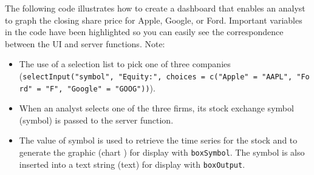 \documentclass[
]{article}
\begin{document}
The following code illustrates how to create a dashboard that enables an
analyst to graph the closing share price for Apple, Google, or Ford.
Important variables in the code have been highlighted so you can easily
see the correspondence between the UI and server functions. Note:

\begin{itemize}
\item
  The use of a selection list to pick one of three companies
  (\texttt{selectInput("symbol",\ "Equity:",\ choices\ =\ c("Apple"\ =\ "AAPL",\ "Ford"\ =\ "F",\ "Google"\ =\ "GOOG"))}).
\item
  When an analyst selects one of the three firms, its stock exchange
  symbol (symbol) is passed to the server function.
\item
  The value of symbol is used to retrieve the time series for the
  stock and to generate the graphic (chart ) for display with
  \texttt{boxSymbol}. The symbol is also inserted into a text string (text) for display with \texttt{boxOutput}.
\end{itemize}
\end{document}
